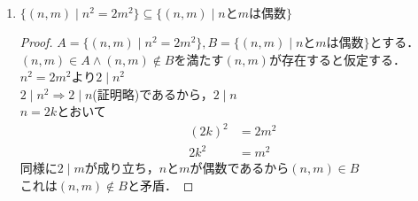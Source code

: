 \documentclass[a4paper,12pt]{ltjsarticle}
\newcommand{\Z}{\mathbb{Z}}
\begin{document}
\begin{enumerate}[(1)]
\begin{proof}
\begin{itemize}
                    すなわち$\{ n \in \Z \mid 5n^2は偶数 \} \supseteq \{ n \in \Z \mid 3n^3は偶数 \}$
            \end{itemize}
            したがって，$\{ n \in \Z \mid 5n^2は偶数 \} = \{ n \in \Z \mid 3n^3は偶数 \}$
        \end{proof}
    \item $\{ (n,m) \mid n^2 = 2m^2 \} \subseteq \{ (n,m) \mid nとmは偶数 \}$
        \begin{proof}
            $A = \{ (n,m) \mid n^2 = 2m^2 \}, B = \{ (n,m) \mid nとmは偶数 \}$とする． \\
            $(n,m) \in A \land (n,m) \notin B$を満たす$(n,m)$が存在すると仮定する． \\
            $n^2 = 2m^2$より$2 \mid n^2$ \\
            $2 \mid n^2 \Rightarrow 2 \mid n$(証明略)であるから，$2 \mid n$ \\
            $n = 2k$とおいて
            \begin{align*}
                (2k)^2 &= 2m^2 \\
                2k^2 &= m^2
            \end{align*}
            同様に$2 \mid m$が成り立ち，$n$と$m$が偶数であるから$(n,m) \in B$ \\
            これは$(n,m) \notin B$と矛盾．
        \end{proof}
\end{enumerate}
\end{document}
